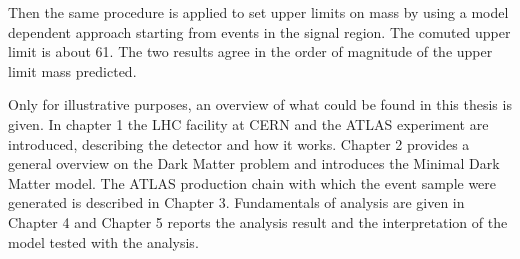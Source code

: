 Then the same procedure is applied to set upper limits on \chizero mass by using a model dependent approach starting from events in the signal region. The comuted upper limit is about \SI{61}{\gev}. The two results agree in the order of magnitude of the upper limit mass predicted.

\medskip
  
  Only for illustrative purposes, an overview of what could be found in this thesis is given. In chapter 1 the LHC facility at CERN and the ATLAS experiment are introduced, describing the detector and how it works. Chapter 2 provides a general overview on the Dark Matter problem and introduces the Minimal Dark Matter model. The ATLAS production chain with which the event sample were generated is described in Chapter 3. Fundamentals of \mph analysis are given in Chapter 4 and Chapter 5 reports the analysis result and the interpretation of the model tested with  the \mph analysis.



